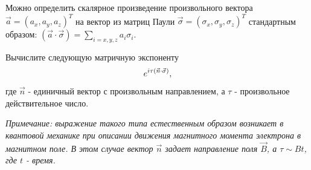 \documentclass[a4paper,12pt]{article}
\begin{document}
\noindent Можно определить скалярное произведение произвольного вектора $\vec{a}=(a_{x},a_{y},a_{z})^{T}$ на вектор из матриц Паули $\vec{\sigma}=(\sigma_{x},\sigma_{y},\sigma_{z})^{T}$ стандартным образом: $\left(\vec{a}\cdot\vec{\sigma}\right)=\sum_{i=x,y,z}a_{i}\sigma_{i}$.

\noindent Вычислите следующую матричную экспоненту
\begin{equation}\notag
e^{i\tau\left(\vec{n}\cdot\vec{\sigma}\right)},
\end{equation}
\noindent где $\vec{n}$ - единичный вектор с произвольным направлением, а $\tau$ - произвольное действительное число.

\noindent \textit{Примечание: выражение такого типа естественным образом возникает в квантовой механике при описании движения магнитного момента электрона в магнитном поле. В этом случае вектор $\vec{n}$ задает направление поля $\vec{B}$, а $\tau\sim Bt$, где $t$ - время.}
\end{document}
